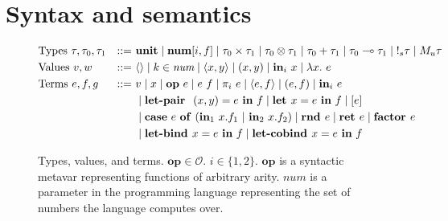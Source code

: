 \section{Syntax and semantics}

\begin{figure}[p]
  \begin{alignat*}{2}
         &\text{Types } \tau, \tau_0, \tau_1 &::=~ &\mathbf{unit}
         \mid \textbf{num}[i, f]
         \mid \tau_0 \times \tau_1
         \mid \tau_0 \otimes \tau_1
         \mid \tau_0 + \tau_1
         \mid \tau_0 \multimap \tau_1
         \mid {{!_{s}} \tau}
         \mid {M_u \tau}
         \\
         &\text{Values } v, w \ &::=~ &\langle \rangle
         \mid k \in \textit{num}
         \mid \langle x,y \rangle 
         \mid (x, y)
         \mid \textbf{in}_i \ x
         \mid \lambda x.~e
         \\
         &\text{Terms } e, f, g &::=~ &v
         \mid x
         \mid \mathbf{op} ~ e
         \mid e~f
         \mid {\pi}_i\ e
         \mid \langle e,f \rangle 
         \mid (e, f)
         \mid \textbf{in}_i \ e \\
         & & & \mid \textbf{let-pair } \ (x,y) = e \ \textbf{in} \ f
         \mid \textbf{let } x  = e \ \textbf{in} \ f 
         \mid [e] \\
         & & & 
         \mid 
          \mathbf{case} \ e \ \mathbf{of} \ (\textbf{in}_1 \ x.f_1 \ | \ \textbf{in}_2 \ x.f_2)
         \mid \textbf{rnd } e
         \mid {\textbf{ret }e} 
         \mid \textbf{factor } e \\
         & & & 
         \mid {\textbf{let-bind }x = e \ \textbf{in}\ f}
         \mid \textbf{let-cobind } x = e \ \textbf{in} \ f
  \end{alignat*}
  \caption{
    Types, values, and terms. $\mathbf{op} \in \mathcal{O}$. $i \in \{1, 2\}$.
    $\textbf{op}$ is a syntactic metavar representing
    functions of arbitrary arity.
    $\textit{num}$ is a parameter in the programming language representing the
    set of numbers the language computes over.
  }
  \label{fig:syntax}
\end{figure}

